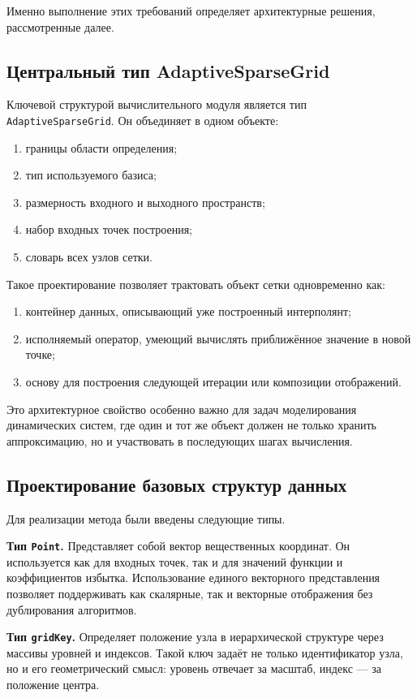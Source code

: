 Именно выполнение этих требований определяет архитектурные решения, рассмотренные далее.

\subsection{Центральный тип AdaptiveSparseGrid}

Ключевой структурой вычислительного модуля является тип \texttt{AdaptiveSparseGrid}. Он объединяет в одном объекте:
\begin{enumerate}
    \item границы области определения;
    \item тип используемого базиса;
    \item размерность входного и выходного пространств;
    \item набор входных точек построения;
    \item словарь всех узлов сетки.
\end{enumerate}

Такое проектирование позволяет трактовать объект сетки одновременно как:
\begin{enumerate}
    \item контейнер данных, описывающий уже построенный интерполянт;
    \item исполняемый оператор, умеющий вычислять приближённое значение в новой точке;
    \item основу для построения следующей итерации или композиции отображений.
\end{enumerate}

Это архитектурное свойство особенно важно для задач моделирования динамических систем, где один и тот же объект должен не только хранить аппроксимацию, но и участвовать в последующих шагах вычисления.

\subsection{Проектирование базовых структур данных}

Для реализации метода были введены следующие типы.

\textbf{Тип \texttt{Point}.} Представляет собой вектор вещественных координат. Он используется как для входных точек, так и для значений функции и коэффициентов избытка. Использование единого векторного представления позволяет поддерживать как скалярные, так и векторные отображения без дублирования алгоритмов.

\textbf{Тип \texttt{gridKey}.} Определяет положение узла в иерархической структуре через массивы уровней и индексов. Такой ключ задаёт не только идентификатор узла, но и его геометрический смысл: уровень отвечает за масштаб, индекс --- за положение центра.

